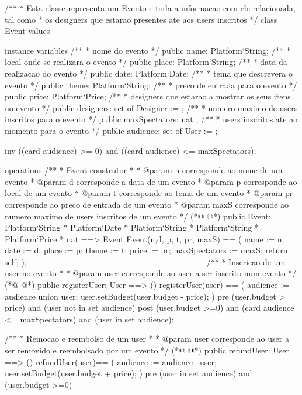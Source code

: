 \begin{vdmpp}[breaklines=true]
/**
* Esta classe representa um Evento e toda a informacao com ele relacionada, tal como
* os designers que estarao presentes ate aos users inscritos
*/  
class Event
values

instance variables
 /**
 * nome do evento
 */
 public name: Platform`String;
 /**
 * local onde se realizara o evento
 */
 public place: Platform`String;
 /**
 * data da realizacao do evento
 */
 public date: Platform`Date;
 /**
 * tema que descrevera o evento
 */
 public theme: Platform`String;
 /**
 * preco de entrada para o evento
 */
 public price: Platform`Price; 
 /**
 * designers que estarao a mostrar os seus itens no evento
 */
 public designers: set of Designer := {};
 /**
 * numero maximo de users inscritos para o evento
 */
 public maxSpectators: nat ;
 /**
 * users inscritos ate ao momento para o evento
 */
 public audience: set of User := {};

 inv ((card audience) >= 0) and ((card audience) <= maxSpectators);
 
operations
 /**
 * Event construtor
 * 
 * @param n corresponde ao nome de um evento
 * @param d corresponde a data de um evento
 * @param p corresponde ao local de um evento
 * @param t corresponde ao tema de um evento
 * @param pr corresponde ao preco de entrada de um evento
 * @param maxS corresponde ao numero maximo de users inscritos de um evento
 */
(*@
\label{Event:55}
@*)
 public Event: Platform`String * Platform`Date * Platform`String *  Platform`String * Platform`Price * nat ==> Event 
 Event(n,d, p, t, pr,  maxS) == 
 (
  name := n;
  date := d;
  place := p;
  theme := t;
  price := pr;
  maxSpectators := maxS;
  return self;
 );
----------------------------------------------------------------
 /**
 * Inscricao de um user no evento
 * 
 * @param user corresponde ao user a ser inscrito num evento
 */
(*@
\label{registerUser:72}
@*)
 public registerUser: User ==> ()
 registerUser(user) ==
 (
  audience := audience union {user};
  user.setBudget(user.budget - price);
 )
 pre (user.budget >= price) and
   (user not in set audience)
 post (user.budget >=0) and
    (card audience <= maxSpectators) and
    (user in set audience);
 
 /**
 * Remocao e reembolso de um user
 * 
 * @param user corresponde ao user a ser removido e reembolsado por um evento
 */
(*@
\label{refundUser:89}
@*)
 public refundUser: User ==> ()
 refundUser(user)==
 (
  audience := audience \ {user};
  user.setBudget(user.budget + price);
 )
 pre (user in set audience) and
   (user.budget >=0)
 

\end{vdmpp}
